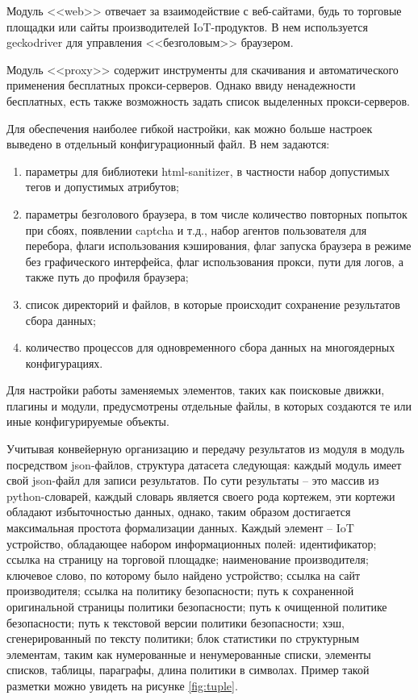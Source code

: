 \documentclass[../main]{subfiles}
\begin{document}
Модуль <<web>> отвечает за взаимодействие с веб-сайтами, будь то торговые площадки или сайты производителей IoT-продуктов. В нем используется geckodriver для управления <<безголовым>> браузером. 

Модуль <<proxy>> содержит инструменты для скачивания и автоматического применения бесплатных прокси-серверов. Однако ввиду ненадежности бесплатных, есть также возможность задать список выделенных прокси-серверов. 

Для обеспечения наиболее гибкой настройки, как можно больше настроек выведено в отдельный конфигурационный файл. В нем задаются:

\begin{enumerate}
    \item параметры для библиотеки html-sanitizer, в частности набор допустимых тегов и допустимых атрибутов;
    \item параметры безголового браузера, в том числе количество повторных попыток при сбоях, появлении captcha и т.д., набор агентов пользователя для перебора, флаги использования кэширования, флаг запуска браузера в режиме без графического интерфейса, флаг использования прокси, пути для логов, а также путь до профиля браузера;
    \item список директорий и файлов, в которые происходит сохранение результатов сбора данных;
    \item количество процессов для одновременного сбора данных на многоядерных конфигурациях.
\end{enumerate}

Для настройки работы заменяемых элементов, таких как поисковые движки, плагины и модули, предусмотрены отдельные файлы, в которых создаются те или иные конфигурируемые объекты.

Учитывая конвейерную организацию и передачу результатов из модуля в модуль посредством json-файлов, структура датасета следующая: каждый модуль имеет свой json-файл для записи результатов. По сути результаты -- это массив из python-словарей, каждый словарь является своего рода кортежем, эти кортежи обладают избыточностью данных, однако, таким образом достигается максимальная простота формализации данных. Каждый элемент -- IoT устройство, обладающее набором информационных полей: идентификатор; ссылка на страницу на торговой площадке; наименование производителя; ключевое слово, по которому было найдено устройство; ссылка на сайт производителя; ссылка на политику безопасности; путь к сохраненной оригинальной страницы политики безопасности; путь к очищенной политике безопасности; путь к текстовой версии политики безопасности; хэш, сгенерированный по тексту политики; блок статистики по структурным элементам, таким как нумерованные и ненумерованные списки, элементы списков, таблицы, параграфы, длина политики в символах. Пример такой разметки можно увидеть на рисунке \ref{fig:tuple}.
\end{document}
